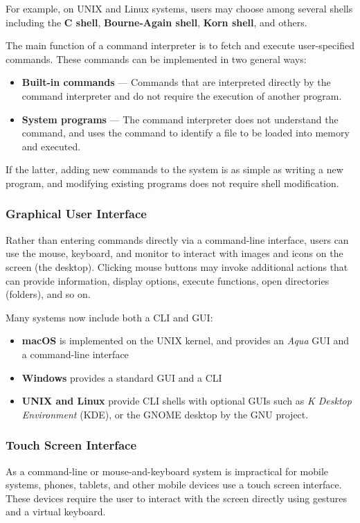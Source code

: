 \documentclass{article}
\begin{document}
For example, on UNIX and Linux systems, users may choose among several shells including the \textbf{C shell}, \textbf{Bourne-Again shell}, \textbf{Korn shell}, and others.

The main function of a command interpreter is to fetch and execute user-specified commands.
These commands can be implemented in two general ways:
\begin{itemize}
    \item \textbf{Built-in commands} --- Commands that are interpreted directly by the command interpreter and do not require the execution of another program.
    \item \textbf{System programs} --- The command interpreter does not understand the command, and uses the command to identify a file to be loaded into memory and executed.
\end{itemize}
If the latter, adding new commands to the system is as simple as writing a new program, and modifying existing programs does not require shell modification.
\subsubsection{Graphical User Interface}
Rather than entering commands directly via a command-line interface, users can use the mouse, keyboard, and monitor to interact with
images and icons on the screen (the desktop). Clicking mouse buttons may invoke additional actions that can provide information, display options,
execute functions, open directories (folders), and so on.

Many systems now include both a CLI and GUI:
\begin{itemize}
    \item \textbf{macOS} is implemented on the UNIX kernel, and provides an \textit{Aqua} GUI and a command-line interface
    \item \textbf{Windows} provides a standard GUI and a CLI
    \item \textbf{UNIX and Linux} provide CLI shells with optional GUIs such as \textit{K Desktop Environment} (KDE), or the GNOME desktop by the GNU project.
\end{itemize}
\subsubsection{Touch Screen Interface}
As a command-line or mouse-and-keyboard system is impractical for mobile systems, phones, tablets, and other mobile devices use a touch screen interface.
These devices require the user to interact with the screen directly using gestures and a virtual keyboard.
\end{document}
